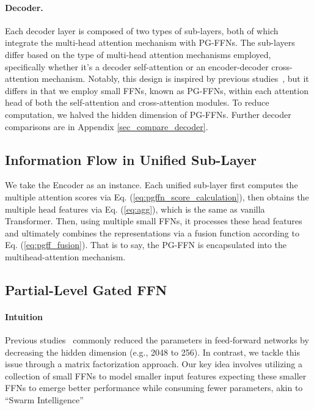 \documentclass[11pt]{article}
\begin{document}
\paragraph{Decoder.}
Each decoder layer is composed of two types of sub-layers, both of which integrate the multi-head attention mechanism with PG-FFNs. The sub-layers differ based on the type of multi-head attention mechanisms employed, specifically whether it's a decoder self-attention or an encoder-decoder cross-attention mechanism. 
Notably, this design is inspired by previous studies~\cite{Lu-etal-2020-Macaron, Gulati-etal-2020-conformer}, but it differs in that we employ small FFNs, known as PG-FFNs, within each attention head of both the self-attention and cross-attention modules. To reduce computation, we halved the hidden dimension of PG-FFNs. Further decoder comparisons are in Appendix \ref{sec_compare_decoder}.


\subsection{Information Flow in Unified Sub-Layer}
We take the Encoder as an instance. Each unified sub-layer first computes the multiple attention scores via Eq. (\ref{eq:pgffn_score_calculation}), then obtains the multiple head features  via Eq. (\ref{eq:agg}), which is the same as vanilla Transformer. Then, using multiple small FFNs, it processes these head features and ultimately combines the representations via a fusion function according to Eq. (\ref{eq:pgff_fusion}).  That is to say, the PG-FFN is encapsulated into the multihead-attention mechanism.
\noindent

\noindent 

\subsection{Partial-Level Gated FFN}

\paragraph{Intuition}





Previous studies~\cite{Wu2020Lite, Mehta2021Delight, ge-etal-2022-edgeformer} commonly reduced the parameters in feed-forward networks by decreasing the hidden dimension (e.g., 2048 to 256). In contrast, we tackle this issue through a matrix factorization approach. Our key idea involves utilizing a collection of small FFNs to model smaller input features expecting these smaller FFNs to emerge better performance while consuming fewer parameters, akin to ``Swarm Intelligence''
\end{document}
